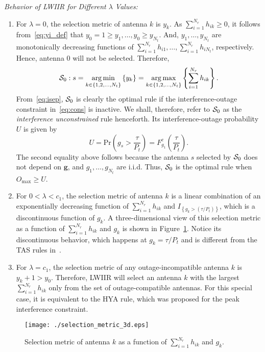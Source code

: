 \documentclass[journal]{IEEEtran}
\newcommand{\brac}[1]{\left({#1}\right)}
\newcommand{\cbrac}[1]{\left\{{#1}\right\}}
\newcommand{\indic}[1]{I_{\cbrac{#1}}}
\newcommand{\prob}[1]{\text{Pr}\brac{#1}}
\DeclareMathOperator*{\argmin}{arg\,min}
\DeclareMathOperator*{\argmax}{arg\,max}
\newcommand{\nx}{{0}}
\newcommand{\lam}{\lambda}
\newcommand{\Nt}{{N_t}}
\newcommand{\Nr}{{N_r}}
\newcommand{\Pt}{{P_t}}
\newcommand{\such}{h}
\newcommand{\puch}{g}
\newcommand{\hk}[1]{{\such_{#1}}}
\newcommand{\gk}[1]{{\puch_{#1}}}
\newcommand{\g}{\mathbf{\puch}}
\newcommand{\outmax}{O_{\text{max}}}
\newcommand{\itau}{\tau}
\newcommand{\cone}{c_{1}}
\newcommand{\taubypt}{\frac{\itau}{\Pt}}
\newcommand{\taubyptinl}{{\itau}/{\Pt}}
\newcommand{\gkgrtaubypt}[1]{{\gk{#1}}>\taubypt}
\newcommand{\gkgrtaubyptinl}[1]{{\gk{#1}}>\left( \taubyptinl \right) }
\newcommand{\yk}[1]{y_{#1}}
\newcommand{\un}{U}
\newcommand{\antopts}{\left\{1,2,\ldots,\Nt\right\}}
\newcommand{\caluncons}{{\cal S_{\text{0}}}}
\newcommand{\sumnr}{\sum_{i=1}^{\Nr}}
\begin{document}
{\em Behavior of LWIIR for Different $\lam$ Values:}
\begin{enumerate}
\item For $\lam=0$, the selection metric of antenna $k$ is $\yk{k}$. As $\sumnr\hk{ik}\geq 0$, it follows from~\eqref{eq:yi_def} that $\yk{0}=1\geq\yk{1},\ldots,\yk{0}\geq\yk{\Nt}$. And,   $\yk{1},\ldots,\yk{\Nt}$ are monotonically decreasing functions of $\sumnr\hk{i1},\ldots,\sumnr\hk{i\Nt}$, respectively. Hence, antenna $\nx$ will not be selected. Therefore, 
\begin{equation}
\caluncons: s = \argmin\limits_{k\in\antopts} \left\{ \yk{k} \right\} = \argmax\limits_{k\in\antopts} \left\{\sumnr \hk{ik} \right\}.
\label{eq:uncons_simple}
\end{equation}
%
From~\eqref{eq:isep}, $\caluncons$ is clearly the optimal  rule if the interference-outage constraint in~\eqref{eq:cons} is inactive. We shall, therefore, refer to $\caluncons$ as the {\em interference unconstrained} rule henceforth. Its interference-outage probability $\un$ is given by
%
\begin{equation}
\un= \prob{\gkgrtaubypt{s}}= F^c_{\gk{1}}\left({\taubypt}\right).
\label{eq:uncomsoutage}
\end{equation}
%
The second equality above follows because the antenna $s$ selected by $\caluncons$ does not depend on $\g$, and $\gk{1},\ldots,\gk{\Nt}$ are i.i.d. Thus, $\caluncons$ is the optimal  rule when $\outmax \geq \un$. 

\item For $0<\lam<\cone$, the selection metric of antenna $k$ is a linear combination of  an exponentially decreasing function of $\sumnr\hk{ik}$ and $\indic{\gkgrtaubyptinl{k}}$, which is a discontinuous function of $\gk{k}$. A three-dimensional view of this selection metric as a function of $\sumnr\hk{ik}$ and $\gk{k}$ is shown in Figure~\ref{fig:metric}. Notice its discontinuous behavior, which happens at $\gk{k}= \itau/\Pt$ and is different from the TAS rules in~\cite{Hanif_2015_globecom,Sarvendranath_2013_TCOM,Sarvendranath_2014_TCOM,Wang_2011_TCom,Fakhan_2014_TSP}.

\item For $\lam=\cone$, the selection metric of any outage-incompatible antenna $k$ is  $\yk{k}+1> \yk{0}$. Therefore, LWIIR will select an antenna $k$ with the largest $\sumnr\hk{ik}$ only from the set of outage-compatible antennas. For this special case, it is equivalent to the HYA rule, which was proposed for the  peak interference constraint.



\end{enumerate}
\begin{figure}
	\centering 
	\texttt{[image: ./selection\_metric\_3d.eps]}
	\caption{Selection metric of antenna $k$ as a function of $\sumnr\hk{ik}$ and $\gk{k}$.}
	\label{fig:metric}
\end{figure}
\end{document}
